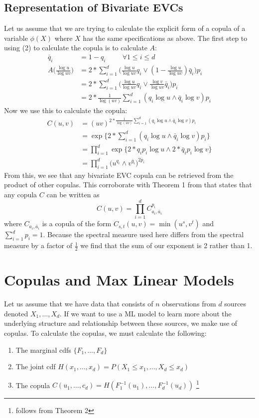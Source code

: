 \documentclass[12pt]{article}
\def\inv{^{-1}}
\newcommand{\ds}{\displaystyle}
\theoremstyle{definition}
\theoremstyle{definition}
\begin{document}
\subsection{Representation of Bivariate EVCs}
Let us assume that we are trying to calculate the explicit form of a copula of a variable $\phi(X)$ where $X$ has the same specifications as above. The first step to using (2) to calculate the copula is to calculate $A$:
\begin{align*}
\bar{q}_i&=1-q_i \hspace{1cm} \forall 1\leq i\leq d\\
    A\big( \frac{\log u}{\log uv} \big)&=2*\sum_{i=1}^d\bigg(\frac{\log u}{\log uv}q_i\vee(1-\frac{\log u}{\log uv})\bar{q}_i\bigg)p_i\\
    &=2*\sum_{i=1}^d\bigg(\frac{\log u}{\log uv}q_i\vee\frac{\log v}{\log uv}\bar{q}_i\bigg)p_i\\
    &=2*\frac{1}{\log(uv)}\sum_{i=1}^d(q_i\log u \wedge \bar{q}_i\log v)p_i
\end{align*}
Now we use this to calculate the copula:
\begin{align*}
 C(u,v)&=(uv)^{2*\frac{1}{\log(uv)}\sum_{i=1}^d(q_i\log u \wedge \bar{q}_i\log v)p_i}\\
    &=\exp\{2*\sum_{i=1}^d(q_i\log u \wedge \bar{q}_i\log v)p_i\}\\
    &=\prod_{i=1}^d\exp\{2*q_ip_i\log u \wedge 2*\bar{q}_ip_i\log v\}\\
    &=\prod_{i=1}^d\bigg(u^{q_i}\wedge v^{\bar{q}_i}\bigg)^{2p_i} \tag{4}
\end{align*}
From this, we see that any bivariate EVC copula can be retrieved from the product of other copulas. This corroborate with Theorem 1 from \cite{bevcart}  that states that any copula $C$ can be written as 
$$C(u,v)= \prod_{i=1}^dC_{a_i,\bar{a}_i}^{p_i}$$
where $C_{a_i,\bar{a}_i}$ is a copula of the form $C_{s,t}(u,v)=\min(u^s,v^t)$ and $\sum_{i=1}^dp_i=1$. Because the spectral measure used here differs from the spectral measure by a factor of $\frac{1}{2}$ we find that the sum of our exponent is 2 rather than 1.
\pagebreak

\section{Copulas and Max Linear Models}
Let us assume that we have data that consists of  $n$ observations from $d$ sources denoted $X_1,\hdots, X_d$. If we want to use a ML model to learn more about the underlying structure and relationship between these sources, we make use of copulas. To calculate the copulas, we must calculate the following:
\begin{enumerate}
    \item The marginal cdfs $\ds\{F_1, \hdots, F_d\}$ \item The joint cdf $H(x_1,\hdots,x_d)=P(X_1\leq x_1, \hdots, X_d\leq x_d)$
    \item The copula $C(u_1,\hdots,c_d)=H(F\inv_1(u_1),\hdots,F\inv_d(u_d))$ \footnote{follows from  Theorem 2}
\end{enumerate}
\end{document}
